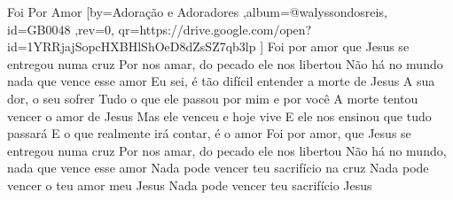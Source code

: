 \beginsong
{Foi Por Amor %
}[by={Adoração e Adoradores %
},album={@walyssondosreis},
id={GB0048 %
},rev={0}, %
qr={https://drive.google.com/open?id=1YRRjajSopcHXBHlShOeD8dZsSZ7qb3lp %
}]
\beginverse*
Foi por amor que Jesus se entregou numa cruz
Por nos amar, do pecado ele nos libertou
Não há no mundo nada que vence esse amor
\endverse
\beginverse*
Eu sei, é tão difícil entender a morte de Jesus
A sua dor, o seu sofrer
Tudo o que ele passou por mim e por você
\endverse
\beginverse*
A morte tentou vencer o amor de Jesus
Mas ele venceu e hoje vive
E ele nos ensinou que tudo passará
E o que realmente irá contar, é o amor
\endverse
\beginchorus
Foi por amor, que Jesus se entregou numa cruz
Por nos amar, do pecado ele nos libertou
Não há no mundo, nada que vence esse amor
\endchorus
\beginverse*
Nada pode vencer teu sacrifício na cruz
Nada pode vencer o teu amor meu Jesus
Nada pode vencer teu sacrifício Jesus
\endverse



